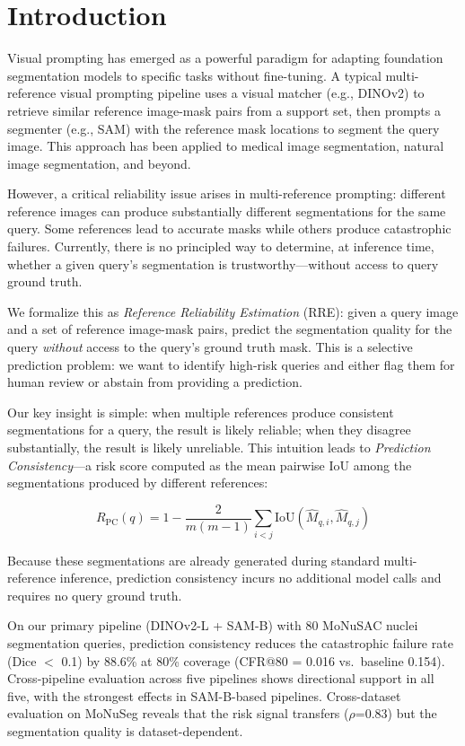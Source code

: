 \documentclass[11pt]{article}
\newcommand{\RRE}{RRE}
\newcommand{\RPC}{R_{\text{PC}}}
\begin{document}
\section{Introduction}

Visual prompting has emerged as a powerful paradigm for adapting foundation segmentation 
models to specific tasks without fine-tuning. A typical multi-reference visual prompting 
pipeline uses a visual matcher (e.g., DINOv2) to retrieve similar reference image-mask pairs 
from a support set, then prompts a segmenter (e.g., SAM) with the reference mask locations 
to segment the query image. This approach has been applied to medical image segmentation, 
natural image segmentation, and beyond.

However, a critical reliability issue arises in multi-reference prompting: different reference 
images can produce substantially different segmentations for the same query. Some references 
lead to accurate masks while others produce catastrophic failures. Currently, there is no 
principled way to determine, at inference time, whether a given query's segmentation is 
trustworthy---without access to query ground truth.

We formalize this as \textit{Reference Reliability Estimation} (\RRE{}): given a query image 
and a set of reference image-mask pairs, predict the segmentation quality for the query 
\textit{without} access to the query's ground truth mask. This is a selective prediction 
problem: we want to identify high-risk queries and either flag them for human review or 
abstain from providing a prediction.

Our key insight is simple: when multiple references produce consistent segmentations for a 
query, the result is likely reliable; when they disagree substantially, the result is likely 
unreliable. This intuition leads to \textit{Prediction Consistency}---a risk score computed 
as the mean pairwise IoU among the segmentations produced by different references:

\begin{equation}
\RPC(q) = 1 - \frac{2}{m(m-1)} \sum_{i<j} \text{IoU}(\hat{M}_{q,i}, \hat{M}_{q,j})
\label{eq:pc}
\end{equation}

Because these segmentations are already generated during standard multi-reference inference, 
prediction consistency incurs no additional model calls and requires no query ground truth.

On our primary pipeline (DINOv2-L + SAM-B) with 80 MoNuSAC nuclei segmentation queries, 
prediction consistency reduces the catastrophic failure rate (Dice $<$ 0.1) by 88.6\% at 
80\% coverage (CFR@80 = 0.016 vs.\ baseline 0.154). Cross-pipeline evaluation across five 
pipelines shows directional support in all five, with the strongest effects in SAM-B-based 
pipelines. Cross-dataset evaluation on MoNuSeg reveals that the risk signal transfers 
($\rho$=0.83) but the segmentation quality is dataset-dependent.
\end{document}
